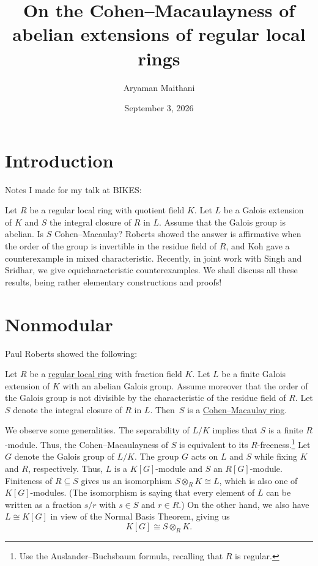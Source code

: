 \documentclass[12pt]{article}
\title{On the Cohen--Macaulayness of abelian extensions of regular local rings}
\author{Aryaman Maithani}
\date{September 3, 2026}
\begin{document}
\maketitle

\section*{Introduction}

Notes I made for my talk at BIKES: \newline

\begin{blockquote}
	Let $R$ be a regular local ring with quotient field $K$. Let $L$ be a Galois extension of $K$ and $S$ the integral closure of $R$ in $L$. Assume that the Galois group is abelian. Is $S$ Cohen--Macaulay? Roberts showed the answer is affirmative when the order of the group is invertible in the residue field of $R$, and Koh gave a counterexample in mixed characteristic. Recently, in joint work with Singh and Sridhar, we give equicharacteristic counterexamples. We shall discuss all these results, being rather elementary constructions and proofs! 
\end{blockquote}

\section{Nonmodular}

	Paul Roberts \cite{Roberts:Abelian} showed the following:

	\begin{thm} \label{thm:roberts}
		Let $R$ be a \underline{regular local ring} with fraction field $K$. Let $L$ be a finite Galois extension of $K$ with an abelian Galois group. Assume moreover that the order of the Galois group is not divisible by the characteristic of the residue field of $R$. Let $S$ denote the integral closure of $R$ in $L$. Then~$S$ is a \underline{Cohen--Macaulay ring}.
	\end{thm}

	We observe some generalities. 
	The separability of $L/K$ implies that $S$ is a finite $R$-module. 
	Thus, the Cohen--Macaulayness of $S$ is equivalent to its $R$-freeness.\footnote{Use the Auslander--Buchsbaum formula, recalling that $R$ is regular.} 
	Let $G$ denote the Galois group of $L/K$. 
	The group $G$ acts on $L$ and $S$ while fixing $K$ and $R$, respectively. 
	Thus, $L$ is a $K[G]$-module and $S$ an $R[G]$-module. 
	Finiteness of $R \subseteq S$ gives us an isomorphism 
	$S \otimes_{R} K \cong L$, which is also one of $K[G]$-modules. 
	(The isomorphism is saying that every element of $L$ can be written as a fraction $s/r$ with $s \in S$ and $r \in R$.) 
	On the other hand, we also have $L \cong K[G]$ in view of the Normal Basis Theorem, giving us
	\begin{equation} \label{eq:L-KG}
		K[G] \cong S \otimes_{R} K. 
	\end{equation}
\end{document}
